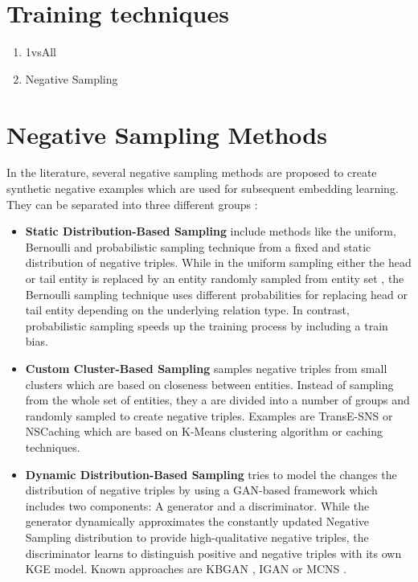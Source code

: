\section{Training techniques}
\begin{enumerate}
    \item 1vsAll 
    
    \item Negative Sampling 
    
\end{enumerate}



\section{Negative Sampling Methods} \label{sec:negativesamplingmethods}
In the literature, several negative sampling methods are proposed to create synthetic negative examples which are used for subsequent embedding learning.
They can be separated into three different groups \cite{qianunderstanding}:
\begin{itemize}
    \item 
    \textbf{Static Distribution-Based Sampling} include methods like the uniform, Bernoulli and probabilistic sampling technique from a fixed and static distribution of negative triples.
	While in the uniform sampling either the head or tail entity is replaced by an entity randomly sampled from entity set \entities,
	the Bernoulli sampling technique uses different probabilities for replacing head or tail entity depending on the underlying relation type.
	In contrast, probabilistic sampling speeds up the training process by including a train bias.
	
	\item 
    \textbf{Custom Cluster-Based Sampling} samples negative triples from small clusters which are based on closeness between entities.
    Instead of sampling from the whole set of entities, they a are divided into a number of groups and randomly sampled to create negative triples. Examples are TransE-\ac{SNS} \cite{TransE-SNS} or \ac{NSCaching} \cite{zhang2019nscaching} which are based on K-Means clustering algorithm or caching techniques. 
    
    \item 
    \textbf{Dynamic Distribution-Based Sampling} tries to model the changes the distribution of negative triples by using a \ac{GAN}-based framework which includes two components: A generator and a discriminator.
	While the generator dynamically approximates the constantly updated Negative Sampling distribution to provide high-qualitative negative triples, 
	the discriminator learns to distinguish positive and negative triples with its own \ac{KGE} model.
	Known approaches are \ac{KBGAN} \cite{cai2017kbgan}, \ac{IGAN}  \cite{IGAN} or \ac{MCNS} \cite{MCNS}.
\end{itemize}


